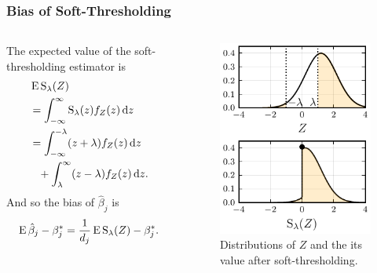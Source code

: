 \documentclass[10pt]{beamer}
\begin{document}
\begin{frame}[c]
  \frametitle{Bias of Soft-Thresholding}

  \begin{columns}
    \begin{column}{0.45\textwidth}
      The expected value of the soft-thresholding estimator is
      \begin{align*}
         & \operatorname{E} \operatorname{S}_\lambda(Z)                                                                                               \\
         & = \int_{-\infty}^\infty \operatorname{S}_\lambda(z) f_Z(z) \mathop{}\!\mathrm{d} z                                                   \nonumber \\
         & = \int_{-\infty}^{-\lambda}(z + \lambda)f_Z(z) \mathop{}\!\mathrm{d} z                                                            \\
         & \phantom{=} + \int_{\lambda}^\infty (z - \lambda)f_Z(z) \mathop{}\!\mathrm{d} z.
      \end{align*}
      And so the bias of \(\hat\beta_j\)  is
      \begin{equation*}
        \operatorname{E} \hat\beta_j - \beta_j^* = \frac{1}{d_j}\operatorname{E} \operatorname{S}_\lambda(Z) - \beta^*_j.
      \end{equation*}
    \end{column}
    \begin{column}{0.45\textwidth}
      \begin{figure}[htpb]
        \centering
        \includegraphics[]{figures/z_normal.pdf}
        \caption{%
          Distributions of \(Z\) and the its value after soft-thresholding.
        }
      \end{figure}
    \end{column}
  \end{columns}

\end{frame}
\end{document}

